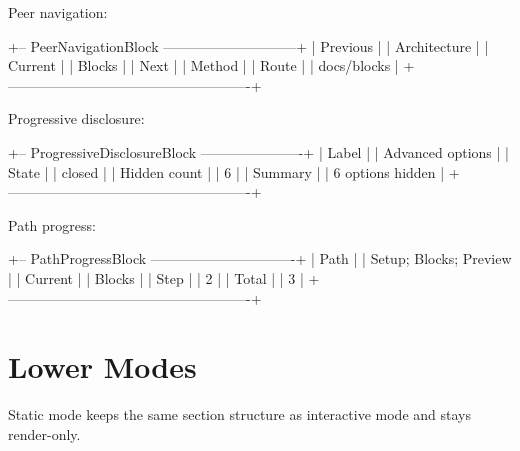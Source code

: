 Peer navigation:

\begin{CodeBlock}
+-- PeerNavigationBlock -----------------------------+
| Previous                                           |
|   Architecture                                     |
| Current                                            |
|   Blocks                                           |
| Next                                               |
|   Method                                           |
| Route                                              |
|   docs/blocks                                      |
+----------------------------------------------------+
\end{CodeBlock}

Progressive disclosure:

\begin{CodeBlock}
+-- ProgressiveDisclosureBlock ----------------------+
| Label                                              |
|   Advanced options                                 |
| State                                              |
|   closed                                           |
| Hidden count                                       |
|   6                                                |
| Summary                                            |
|   6 options hidden                                 |
+----------------------------------------------------+
\end{CodeBlock}

Path progress:

\begin{CodeBlock}
+-- PathProgressBlock -------------------------------+
| Path                                               |
|   Setup; Blocks; Preview                           |
| Current                                            |
|   Blocks                                           |
| Step                                               |
|   2                                                |
| Total                                              |
|   3                                                |
+----------------------------------------------------+
\end{CodeBlock}

\section{Lower Modes}\label{record-096-lower-modes}

Static mode keeps the same section structure as interactive mode and stays render-only.


